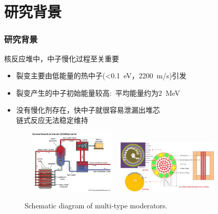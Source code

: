 \small
\section{研究背景}
\begin{frame}
	\frametitle{研究背景}
	核反应堆中，中子慢化过程至关重要
	\begin{itemize}
		\item 裂变主要由低能量的热中子\textrm{(<0.1~eV，2200~m/s)}引发
		\item 裂变产生的中子初始能量较高:~平均能量约为\textrm{2~MeV}
		\item 没有慢化剂存在，快中子就很容易泄漏出堆芯\\
			链式反应无法稳定维持
	\end{itemize}
\begin{figure}[!ht]
\centering
\vspace*{-0.05in}
\includegraphics[height=1.20in,width=1.90in,viewport=0 0 1600 1191,clip]{Figures/Nuclear-power-plant-reactor-Canada-Deuterium.jpg}
\includegraphics[height=1.00in,width=1.90in,viewport=0 0 440 230,clip]{Figures/Schematic_diagram_of_Topaz-II_reactor.jpeg}
\caption{\tiny \textrm{Schematic diagram of multi-type moderators.}}
\label{Fig:Characteristic_structures-for-the_𝛾-ZrH_𝛿-ZrH1.5_and_𝜀-ZrH2-in-Zr_hydrides}
\end{figure}
\end{frame}

